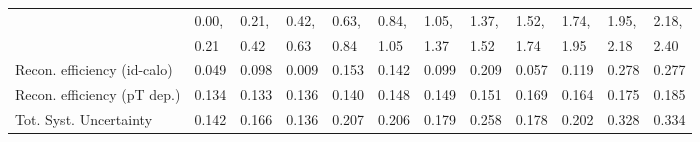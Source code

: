 \begin{tabular}{l|p{0.6cm}p{0.6cm}p{0.6cm}p{0.6cm}p{0.6cm}p{0.6cm}p{0.6cm}p{0.6cm}p{0.6cm}p{0.6cm}p{0.6cm}}
\hline
   & 0.00, & 0.21, & 0.42, & 0.63, & 0.84, & 1.05, & 1.37, & 1.52, & 1.74, & 1.95, & 2.18,  \\ 
   & 0.21 & 0.42 & 0.63 & 0.84 & 1.05 & 1.37 & 1.52 & 1.74 & 1.95 & 2.18 & 2.40  \\ 
\hline
Recon. efficiency (id-calo)              & 0.049 & 0.098 & 0.009 & 0.153 & 0.142 & 0.099 & 0.209 & 0.057 & 0.119 & 0.278 & 0.277 \\
\hline
Recon. efficiency (pT dep.)              & 0.134 & 0.133 & 0.136 & 0.140 & 0.148 & 0.149 & 0.151 & 0.169 & 0.164 & 0.175 & 0.185 \\
\hline
Tot. Syst. Uncertainty                   & 0.142 & 0.166 & 0.136 & 0.207 & 0.206 & 0.179 & 0.258 & 0.178 & 0.202 & 0.328 & 0.334 \\
\hline
\end{tabular}
